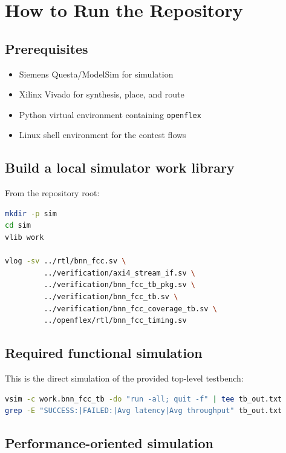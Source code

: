\documentclass[11pt]{article}
\begin{document}
\section{How to Run the Repository}

\subsection{Prerequisites}

\begin{itemize}[leftmargin=1.5em]
\item Siemens Questa/ModelSim for simulation
\item Xilinx Vivado for synthesis, place, and route
\item Python virtual environment containing \texttt{openflex}
\item Linux shell environment for the contest flows
\end{itemize}

\subsection{Build a local simulator work library}

From the repository root:

\begin{lstlisting}[style=repo,language=bash]
mkdir -p sim
cd sim
vlib work

vlog -sv ../rtl/bnn_fcc.sv \
         ../verification/axi4_stream_if.sv \
         ../verification/bnn_fcc_tb_pkg.sv \
         ../verification/bnn_fcc_tb.sv \
         ../verification/bnn_fcc_coverage_tb.sv \
         ../openflex/rtl/bnn_fcc_timing.sv
\end{lstlisting}

\subsection{Required functional simulation}

This is the direct simulation of the provided top-level testbench:

\begin{lstlisting}[style=repo,language=bash]
vsim -c work.bnn_fcc_tb -do "run -all; quit -f" | tee tb_out.txt
grep -E "SUCCESS:|FAILED:|Avg latency|Avg throughput" tb_out.txt
\end{lstlisting}

\subsection{Performance-oriented simulation}
\label{sec:perf-cmd}
\end{document}
